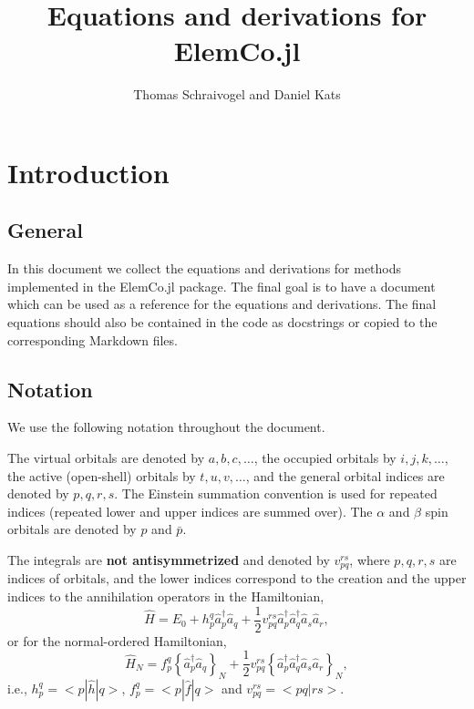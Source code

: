\documentclass[a4paper,12pt,oneside]{book}
\newcommand{\op}{\hat}
\newcommand{\spa}[1]{{#1}}
\newcommand{\spb}[1]{\bar{#1}}
\newcommand{\ElemCojl}{\textsf{ElemCo.jl} }
\begin{document}
\title{Equations and derivations for \ElemCojl}
\author{Thomas Schraivogel and Daniel Kats}
\maketitle
\tableofcontents
\chapter{Introduction}
\section{General}
In this document we collect the equations and derivations for methods implemented in the \ElemCojl package.
The final goal is to have a document which can be used as a reference for the equations and derivations.
The final equations should also be contained in the code as docstrings or copied to the corresponding Markdown files.

\section{Notation}

We use the following notation throughout the document.

The virtual orbitals are denoted by $a,b,c,\ldots$, the occupied orbitals by $i,j,k,\ldots$,
the active (open-shell) orbitals by $t,u,v,\ldots$,
and the general orbital indices are denoted by $p,q,r,s$.
The Einstein summation convention is used for repeated indices (repeated lower and upper indices are summed over).
The $\alpha$ and $\beta$ spin orbitals are denoted by $\spa{p}$ and $\spb{p}$.

The integrals are \textbf{not antisymmetrized} and denoted by $v_{pq}^{rs}$, where $p,q,r,s$ are indices of orbitals,
and the lower indices correspond to the creation and the upper indices to the annihilation operators in the Hamiltonian,
\begin{equation}
  \op H = E_0 + h_p^q \op a^\dagger_p \op a_q + 
  \frac{1}{2} v_{pq}^{rs} \op a^\dagger_p \op a^\dagger_q \op a_s \op a_r,
\end{equation}
or for the normal-ordered Hamiltonian,
\begin{equation}
  \op H_N = f_p^q \left\{\op a^\dagger_p \op a_q\right\}_N + 
  \frac{1}{2} v_{pq}^{rs} \left\{\op a^\dagger_p \op a^\dagger_q \op a_s \op a_r\right\}_N,
\end{equation}
i.e., $h_p^q = <p|\op h|q>$, $f_p^q = <p|\op f|q>$ and $v_{pq}^{rs} = <pq|rs>$.
\end{document}
